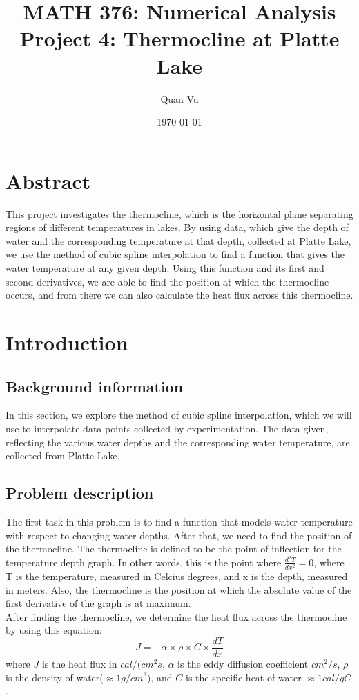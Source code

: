 \documentclass{article}
\title{%
	MATH 376: Numerical Analysis \\
	\large  Project 4: Thermocline at Platte Lake
	}
\author{Quan Vu}
\date{\today}
\begin{document}
	\maketitle
	
	\section{Abstract}
	This project investigates the thermocline, which is the horizontal plane separating regions of different temperatures in lakes. By using data, which give the depth of water and the corresponding temperature at that depth, collected at Platte Lake, we use the method of cubic spline interpolation to find a function that gives the water temperature at any given depth. Using this function and its first and second derivatives, we are able to find the position at which the thermocline occurs, and from there we can also calculate the heat flux across this thermocline.
	
	\section{Introduction}
	
	\subsection{Background information}
	In this section, we explore the method of cubic spline interpolation, which we will use to interpolate data points collected by experimentation. The data given, reflecting the various water depths and the corresponding water temperature, are collected from Platte Lake.
	
	\subsection{Problem description}
	The first task in this problem is to find a function that models water temperature with respect to changing water depths. After that, we need to find the position of the thermocline. The thermocline is defined to be the point of inflection for the temperature depth graph. In other words, this is the point where ${\frac{d^2T}{dx^2} = 0}$, where T is the temperature, measured in Celcius degrees, and x is the depth, measured in meters. Also, the thermocline is the position at which the absolute value of the first derivative of the graph is at maximum.\\
	After finding the thermocline, we determine the heat flux across the thermocline by using this equation:
	\[J = -\alpha \times \rho \times C \times \frac{dT}{dx}\]
	where ${J}$ is the heat flux in ${cal/(cm^2s}$, ${\alpha}$ is the eddy diffusion coefficient ${cm^2/s}$, ${\rho}$ is the density of water(${\approx 1 g/cm^3)}$, and ${C}$ is the specific heat of water ${\approx 1 cal/gC}$.
    
\end{document}
